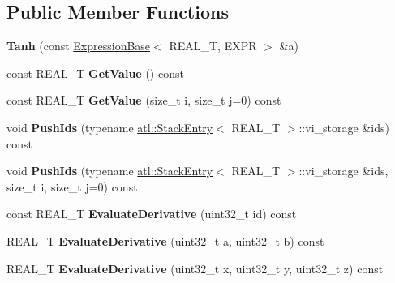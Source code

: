 \subsection*{Public Member Functions}
\begin{DoxyCompactItemize}
\item 
\hypertarget{structatl_1_1_tanh_a653bd91c7ede867cdd382d463936cecd}{{\bfseries Tanh} (const \hyperlink{structatl_1_1_expression_base}{Expression\+Base}$<$ R\+E\+A\+L\+\_\+\+T, E\+X\+P\+R $>$ \&a)}\label{structatl_1_1_tanh_a653bd91c7ede867cdd382d463936cecd}

\item 
\hypertarget{structatl_1_1_tanh_af7853c511c4b0c2cb8f5ac8940f6a9bb}{const R\+E\+A\+L\+\_\+\+T {\bfseries Get\+Value} () const }\label{structatl_1_1_tanh_af7853c511c4b0c2cb8f5ac8940f6a9bb}

\item 
\hypertarget{structatl_1_1_tanh_a109ae48d7db65d57faeff76a2673e746}{const R\+E\+A\+L\+\_\+\+T {\bfseries Get\+Value} (size\+\_\+t i, size\+\_\+t j=0) const }\label{structatl_1_1_tanh_a109ae48d7db65d57faeff76a2673e746}

\item 
\hypertarget{structatl_1_1_tanh_a533181c192a4fa20640ae523586f76aa}{void {\bfseries Push\+Ids} (typename \hyperlink{structatl_1_1_stack_entry}{atl\+::\+Stack\+Entry}$<$ R\+E\+A\+L\+\_\+\+T $>$\+::vi\+\_\+storage \&ids) const }\label{structatl_1_1_tanh_a533181c192a4fa20640ae523586f76aa}

\item 
\hypertarget{structatl_1_1_tanh_ad42e0b192892e0541633e0444f8f2874}{void {\bfseries Push\+Ids} (typename \hyperlink{structatl_1_1_stack_entry}{atl\+::\+Stack\+Entry}$<$ R\+E\+A\+L\+\_\+\+T $>$\+::vi\+\_\+storage \&ids, size\+\_\+t i, size\+\_\+t j=0) const }\label{structatl_1_1_tanh_ad42e0b192892e0541633e0444f8f2874}

\item 
\hypertarget{structatl_1_1_tanh_af000d03c596d34baa208a3c4307c323f}{const R\+E\+A\+L\+\_\+\+T {\bfseries Evaluate\+Derivative} (uint32\+\_\+t id) const }\label{structatl_1_1_tanh_af000d03c596d34baa208a3c4307c323f}

\item 
\hypertarget{structatl_1_1_tanh_ac38515d4eac1331ab64d38bca7c46aa4}{R\+E\+A\+L\+\_\+\+T {\bfseries Evaluate\+Derivative} (uint32\+\_\+t a, uint32\+\_\+t b) const }\label{structatl_1_1_tanh_ac38515d4eac1331ab64d38bca7c46aa4}

\item 
\hypertarget{structatl_1_1_tanh_a1b74204c2742d5815cf15dbcde27f312}{R\+E\+A\+L\+\_\+\+T {\bfseries Evaluate\+Derivative} (uint32\+\_\+t x, uint32\+\_\+t y, uint32\+\_\+t z) const }\label{structatl_1_1_tanh_a1b74204c2742d5815cf15dbcde27f312}


\end{DoxyCompactItemize}
